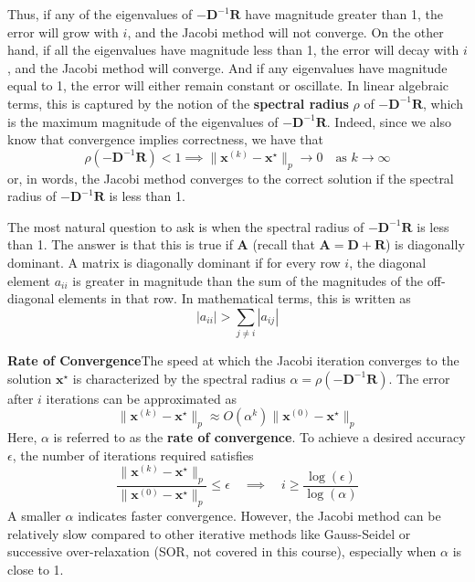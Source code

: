 Thus, if any of the eigenvalues of $-\mathbf{D}^{-1}\mathbf{R}$ have magnitude greater than 1, the error will grow with $i$, and the Jacobi method will not converge. On the other hand, if all the eigenvalues have magnitude less than 1, the error will decay with $i$, and the Jacobi method will converge. And if any eigenvalues have magnitude equal to 1, the error will either remain constant or oscillate. In linear algebraic terms, this is captured by the notion of the \textbf{spectral radius} $\rho$ of $-\mathbf{D}^{-1}\mathbf{R}$, which is the maximum magnitude of the eigenvalues of $-\mathbf{D}^{-1}\mathbf{R}$. Indeed, since we also know that convergence implies correctness, we have that
\begin{equation*}
    \rho(-\mathbf{D}^{-1}\mathbf{R}) < 1 \implies \|\mathbf{x}^{(k)} - \mathbf{x}^\star\|_p \to 0 \quad \text{as } k \to \infty
\end{equation*}
or, in words, the Jacobi method converges to the correct solution if the spectral radius of $-\mathbf{D}^{-1}\mathbf{R}$ is less than 1.

The most natural question to ask is when the spectral radius of $-\mathbf{D}^{-1}\mathbf{R}$ is less than 1. The answer is that this is true if $\mathbf{A}$ (recall that $\mathbf{A} = \mathbf{D} + \mathbf{R}$) is diagonally dominant. A matrix is diagonally dominant if for every row $i$, the diagonal element $a_{ii}$ is greater in magnitude than the sum of the magnitudes of the off-diagonal elements in that row. In mathematical terms, this is written as
\begin{equation*}
    |a_{ii}| > \sum_{j \neq i} |a_{ij}|
\end{equation*}

\textbf{Rate of Convergence}\quad The speed at which the Jacobi iteration converges to the solution $\mathbf{x}^\star$ is characterized by the spectral radius $\alpha = \rho(-\mathbf{D}^{-1}\mathbf{R})$. The error after $i$ iterations can be approximated as
\begin{equation*}
    \|\mathbf{x}^{(k)} - \mathbf{x}^\star\|_p \approx O(\alpha^k) \|\mathbf{x}^{(0)} - \mathbf{x}^\star\|_p
\end{equation*}
Here, $\alpha$ is referred to as the \textbf{rate of convergence}. To achieve a desired accuracy $\epsilon$, the number of iterations required satisfies
\begin{equation*}
    \frac{\|\mathbf{x}^{(k)} - \mathbf{x}^\star\|_p}{\|\mathbf{x}^{(0)} - \mathbf{x}^\star\|_p} \leq \epsilon 
    \quad\implies\quad 
    i \geq \frac{\log(\epsilon)}{\log(\alpha)}
\end{equation*}
A smaller $\alpha$ indicates faster convergence. However, the Jacobi method can be relatively slow compared to other iterative methods like Gauss-Seidel or successive over-relaxation (SOR, not covered in this course), especially when $\alpha$ is close to 1.

